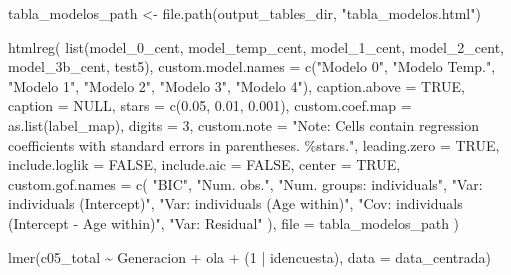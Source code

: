 \documentclass[
  spanish,
  a4paper,
  oneside]{scrbook}
\newenvironment{Shaded}{\begin{snugshade}}{\end{snugshade}}
\newcommand{\AttributeTok}[1]{\textcolor[rgb]{0.40,0.45,0.13}{#1}}
\newcommand{\ConstantTok}[1]{\textcolor[rgb]{0.56,0.35,0.01}{#1}}
\newcommand{\DecValTok}[1]{\textcolor[rgb]{0.68,0.00,0.00}{#1}}
\newcommand{\FloatTok}[1]{\textcolor[rgb]{0.68,0.00,0.00}{#1}}
\newcommand{\FunctionTok}[1]{\textcolor[rgb]{0.28,0.35,0.67}{#1}}
\newcommand{\NormalTok}[1]{\textcolor[rgb]{0.00,0.23,0.31}{#1}}
\newcommand{\OtherTok}[1]{\textcolor[rgb]{0.00,0.23,0.31}{#1}}
\newcommand{\SpecialCharTok}[1]{\textcolor[rgb]{0.37,0.37,0.37}{#1}}
\newcommand{\StringTok}[1]{\textcolor[rgb]{0.13,0.47,0.30}{#1}}
\begin{document}
\begin{Shaded}
\begin{Highlighting}[]
\NormalTok{tabla\_modelos\_path }\OtherTok{\textless{}{-}} \FunctionTok{file.path}\NormalTok{(output\_tables\_dir, }\StringTok{"tabla\_modelos.html"}\NormalTok{)}

\FunctionTok{htmlreg}\NormalTok{(}
  \FunctionTok{list}\NormalTok{(model\_0\_cent, model\_temp\_cent, model\_1\_cent,}
\NormalTok{       model\_2\_cent, model\_3b\_cent, test5),}
  \AttributeTok{custom.model.names =} \FunctionTok{c}\NormalTok{(}\StringTok{"Modelo 0"}\NormalTok{, }\StringTok{"Modelo Temp."}\NormalTok{, }\StringTok{"Modelo 1"}\NormalTok{,}
                         \StringTok{"Modelo 2"}\NormalTok{, }\StringTok{"Modelo 3"}\NormalTok{, }\StringTok{"Modelo 4"}\NormalTok{),}
  \AttributeTok{caption.above =} \ConstantTok{TRUE}\NormalTok{,}
  \AttributeTok{caption =} \ConstantTok{NULL}\NormalTok{,}
  \AttributeTok{stars =} \FunctionTok{c}\NormalTok{(}\FloatTok{0.05}\NormalTok{, }\FloatTok{0.01}\NormalTok{, }\FloatTok{0.001}\NormalTok{),}
  \AttributeTok{custom.coef.map =} \FunctionTok{as.list}\NormalTok{(label\_map),}
  \AttributeTok{digits =} \DecValTok{3}\NormalTok{,}
  \AttributeTok{custom.note =} \StringTok{"Note: Cells contain regression coefficients with standard errors in parentheses. \%stars."}\NormalTok{,}
  \AttributeTok{leading.zero =} \ConstantTok{TRUE}\NormalTok{,}
  \AttributeTok{include.loglik =} \ConstantTok{FALSE}\NormalTok{,}
  \AttributeTok{include.aic =} \ConstantTok{FALSE}\NormalTok{,}
  \AttributeTok{center =} \ConstantTok{TRUE}\NormalTok{,}
  \AttributeTok{custom.gof.names =} \FunctionTok{c}\NormalTok{(}
    \StringTok{"BIC"}\NormalTok{,}
    \StringTok{"Num. obs."}\NormalTok{,}
    \StringTok{"Num. groups: individuals"}\NormalTok{,}
    \StringTok{"Var: individuals (Intercept)"}\NormalTok{,}
    \StringTok{"Var: individuals (Age within)"}\NormalTok{,}
    \StringTok{"Cov: individuals (Intercept {-} Age within)"}\NormalTok{,}
    \StringTok{"Var: Residual"}
\NormalTok{  ),}
  \AttributeTok{file =}\NormalTok{ tabla\_modelos\_path}
\NormalTok{)}

\FunctionTok{lmer}\NormalTok{(c05\_total }\SpecialCharTok{\textasciitilde{}}\NormalTok{ Generacion }\SpecialCharTok{+}\NormalTok{ ola }\SpecialCharTok{+}\NormalTok{ (}\DecValTok{1} \SpecialCharTok{|}\NormalTok{ idencuesta),}
     \AttributeTok{data =}\NormalTok{ data\_centrada)}
\end{Highlighting}
\end{Shaded}
\end{document}
